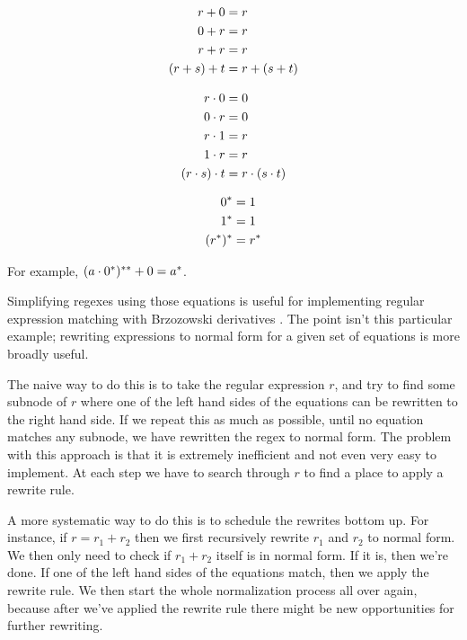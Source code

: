 \begin{minipage}[t]{0.3\textwidth}
  \begin{align*}
    r + 0 &= r \\
    0 + r &= r \\
    r + r &= r \\
    (r + s) + t &= r + (s + t) \\
  \end{align*}
\end{minipage}
\begin{minipage}[t]{0.3\textwidth}
  \begin{align*}
    r \cdot 0 &= 0 \\
    0 \cdot r &= 0 \\
    r \cdot 1 &= r \\
    1 \cdot r &= r \\
    (r \cdot s) \cdot t &= r \cdot (s \cdot t) \\
  \end{align*}
\end{minipage}
\begin{minipage}[t]{0.3\textwidth}
  \begin{align*}
    0^* &= 1 \\
    1^* &= 1 \\
    (r^*)^* &= r^*
  \end{align*}
\end{minipage}

For example, $(a \cdot 0^*)^{**} + 0 = a^*$.

Simplifying regexes using those equations is useful for implementing regular expression matching with Brzozowski derivatives \cite{brzozowski64,owens_reppy_turon_2009}.
The point isn't this particular example; rewriting expressions to normal form for a given set of equations is more broadly useful.

The naive way to do this is to take the regular expression $r$, and try to find some subnode of $r$ where one of the left hand sides of the equations can be rewritten to the right hand side.
If we repeat this as much as possible, until no equation matches any subnode, we have rewritten the regex to normal form.
The problem with this approach is that it is extremely inefficient and not even very easy to implement. At each step we have to search through $r$ to find a place to apply a rewrite rule.

A more systematic way to do this is to schedule the rewrites bottom up. For instance, if $r = r_1 + r_2$ then we first recursively rewrite $r_1$ and $r_2$ to normal form. We then only need to check if $r_1 + r_2$ itself is in normal form. If it is, then we're done. If one of the left hand sides of the equations match, then we apply the rewrite rule. We then start the whole normalization process all over again, because after we've applied the rewrite rule there might be new opportunities for further rewriting.


